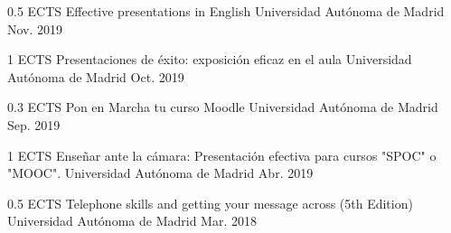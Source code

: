 \begin{cventries}
	\cventry
	{0.5 ECTS} %
	{Effective presentations in English} %
	{Universidad Autónoma de Madrid} %
	{Nov. 2019} %
	{}
	
	\cventry
	{1 ECTS} %
	{Presentaciones de éxito: exposición eficaz en el aula} %
	{Universidad Autónoma de Madrid} %
	{Oct. 2019} %
	{}
	
	\cventry
	{0.3 ECTS} %
	{Pon en Marcha tu curso Moodle} %
	{Universidad Autónoma de Madrid} %
	{Sep. 2019} %
	{}
	
	\cventry
	{1 ECTS} %
	{Enseñar ante la cámara: Presentación efectiva para cursos "SPOC" o
		"MOOC".} %
	{Universidad Autónoma de Madrid} %
	{Abr. 2019} %
	{}
	
	\cventry
	{0.5 ECTS} %
	{Telephone skills and getting your message across (5th Edition)} %
	{Universidad Autónoma de Madrid} %
	{Mar. 2018} %
	{}
	
\end{cventries}


